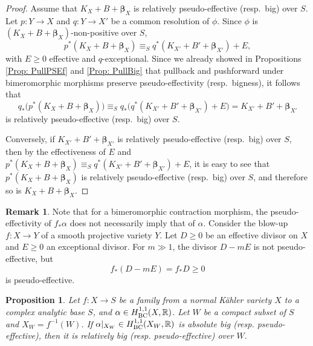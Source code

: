 \documentclass[12pt]{amsart}
\numberwithin{equation}{section}
\newtheorem{proposition}[theorem]{Proposition}
\theoremstyle{definition}
\theoremstyle{plain}
\newtheorem*{thm A*}{Theorem A}
\newtheorem*{thm B*}{Theorem B}
\newtheorem*{thm C*}{Theorem C}
\newtheorem*{thm D*}{Theorem D}
\theoremstyle{definition}
\newtheorem{remark}  [theorem]     {Remark}
\renewcommand{\1}{\mathds{1}}
\newcommand{\bbeta}{\boldsymbol{\beta}}
\renewcommand{\>}{\rightarrow}
\begin{document}
\begin{proof}
Assume that $K_{X}+ B+ {\bbeta}_X$ is relatively pseudo-effective (resp.\ big) over $S$. 
Let $p:Y \to X$ and $q:Y \to X'$ be a common resolution of $\phi$. 
Since $\phi$ is $(K_{X}+B+{\bbeta}_X)$-non-positive over $S$,  $$p^*(K_{X}+ B+{\bbeta}_X) \equiv_S 
q^*(K_{X'}+B'+ {\bbeta}_{X'}) + E,$$
with $E \ge 0$ effective and $q$-exceptional. 
Since we already showed in Propositions \ref{Prop: PullPSEf} and \ref{Prop: PullBig} that pullback and pushforward under bimeromorphic morphisms preserve pseudo-effectivity (resp.\ bigness), it follows that
\[
q_*\bigl(p^*(K_{X}+B + {\bbeta}_X)\bigr) 
\equiv_S 
q_*\bigl(q^*(K_{X'}+B'+ {\bbeta}_{X'}) + E\bigr) 
= K_{X'}+ B'+ {\bbeta}_{X'}
\]
is relatively pseudo-effective (resp.\ big) over $S$. 

Conversely, if $K_{X'}+B'+ {\bbeta}_{X'}$ is relatively pseudo-effective (resp.\ big) over $S$, then by the effectiveness of $E$ and $p^*(K_{X}+ B+{\bbeta}_X) \equiv_S 
q^*(K_{X'}+B'+ {\bbeta}_{X'}) + E$, it is easy to see that 
$p^*(K_{X}+ B+ {\bbeta}_X)$ is relatively pseudo-effective (resp.\ big) over $S$, and therefore so is 
$K_{X}+ B+ {\bbeta}_X$.
\end{proof}

\begin{remark}
Note that for a bimeromorphic contraction morphism, the pseudo-effectivity of $ f_*  \alpha $  does not necessarily imply that of $  { {\alpha}} $. Consider the blow-up $ f : X \to Y $ of a smooth projective variety $ Y $. Let $ D \ge 0 $ be an effective divisor on $ X $ and $ E \ge 0 $ an exceptional divisor. For $ m \gg 1 $, the divisor $ D - mE $ is not pseudo-effective, but
\[
f_*(D - mE) = f_* D \ge 0
\]
is pseudo-effective.
\end{remark}


\begin{proposition}\label{AbsRelativepseff}
Let $f:X\to S$ be a family from a normal K\"ahler variety $X$ to a complex analytic base $S$, and $\alpha \in H^{1,1}_{\rm{BC}}(X,\mathbb{R})$. Let $W$ be a compact subset of $S$ and $X_W = f^{-1}(W)$. If $\alpha|_{X_W} \in H^{1,1}_{\rm{BC}}(X_W,\mathbb{R})$ is absolute big (resp. pseudo-effective), then it is relatively big (resp. pseudo-effective) over $W$. 
\end{proposition}
\end{document}
